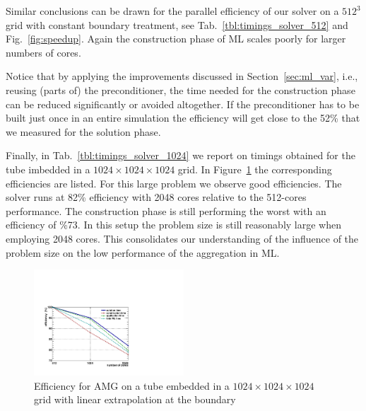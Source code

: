 Similar conclusions can be drawn for the parallel efficiency of our
solver on a $512^3$ grid with constant boundary treatment, see
Tab.~\ref{tbl:timings_solver_512} and Fig.~\ref{fig:speedup}.  Again the
construction phase of ML scales poorly for larger numbers of cores.

Notice that by applying the improvements discussed in
Section~\ref{sec:ml_var}, i.e., reusing (parts of) the preconditioner,
the time needed for the construction phase can be reduced significantly
or avoided altogether.  If the preconditioner has to be built just once
in an entire simulation the efficiency will get close to the 52\% that
we measured for the solution phase.  


Finally, in Tab.~\ref{tbl:timings_solver_1024} we report on timings
obtained for the tube imbedded in a $1024\times1024\times1024$ grid.  In
Figure~\ref{fig:speedup_1024} the corresponding efficiencies are listed.
For this large problem we observe good efficiencies.  The solver runs at
82\% efficiency with 2048 cores relative to the 512-cores performance.
The construction phase is still performing the worst with an efficiency
of \%73.  In this setup the problem size is still reasonably large when
employing 2048 cores.  This consolidates our understanding of the
influence of the problem size on the low performance of the aggregation
in ML.

\begin{figure}[htb] 
  \begin{center}
    \includegraphics[width=0.5\textwidth]{figures/eff_1024_lin.pdf}
    \caption{Efficiency for AMG on a tube embedded in a
      $1024\times1024\times1024$ grid with linear extrapolation at the
      boundary \label{fig:speedup_1024}}
  \end{center} 
\end{figure}

